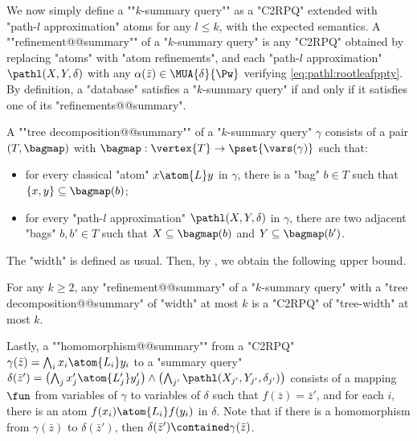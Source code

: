 \AP We now simply define a ""$k$-summary query"" as a "C2RPQ" extended with "path-$l$ approximation" atoms for any $l\leq k$, with the expected semantics.
A \AP""refinement@@summary"" of a "$k$-summary query" is any "C2RPQ" obtained by
replacing "atoms" with "atom refinements", and 
each "path-$l$ approximation" $\pathl(X, Y, \delta)$ with any
$\alpha(\bar z) \in \MUA{\delta}{\Pw}$ verifying \eqref{eq:pathl:rootleafppty}. By definition,
a "database" satisfies a "$k$-summary query" if and only if it
satisfies one of its "refinements@@summary".

A \AP ""tree decomposition@@summary"" of a "$k$-summary query" $\gamma$ consists of
a pair $(T, \bagmap)$ with $\bagmap: \vertex{T} \to \pset{\vars(\gamma)}$
such that:
\begin{itemize}
	\item for every classical "atom" $x \atom{L} y$ in $\gamma$,
		there is a "bag" $b \in T$ such that $\{x,y\} \subseteq \bagmap(b)$;
	\item for every "path-$l$ approximation" $\pathl(X, Y, \delta)$ in $\gamma$,
		there are two adjacent "bags" $b, b' \in T$ such that $X \subseteq \bagmap(b)$
		and $Y \subseteq \bagmap(b')$.
\end{itemize}
The "width" is defined as usual. Then, by
, we obtain the following upper bound.

\begin{fact}
	\AP\label{fact:tree-width-summary}
	For any $k\geq 2$, any "refinement@@summary" of a "$k$-summary query" with
	a "tree decomposition@@summary" of "width" at most $k$ is a "C2RPQ" of "tree-width" at most $k$.
\end{fact}

Lastly, a \AP""homomorphism@@summary"" from a "C2RPQ"
$\gamma(\bar z) = \bigwedge_{i} x_i \atom{L_i} y_i$
to a "summary query" $\delta(\bar z') =
\bigl( \bigwedge_{j} x'_j \atom{L'_j} y'_j \bigr)
\wedge \bigl( \bigwedge_{j'} \pathl(X_{j'}, Y_{j'}, \delta_{j'}) \bigr)$
consists of a mapping $\fun$ from variables of $\gamma$ to variables of $\delta$
such that $f(\bar z) = \bar z'$, and for each $i$,
there is an atom $f(x_i) \atom{L_i} f(y_i)$ in $\delta$.
Note that if there is a homomorphism from $\gamma(\bar z)$ to $\delta(\bar z')$,
then $\delta(\bar z') \contained \gamma(\bar z)$.

